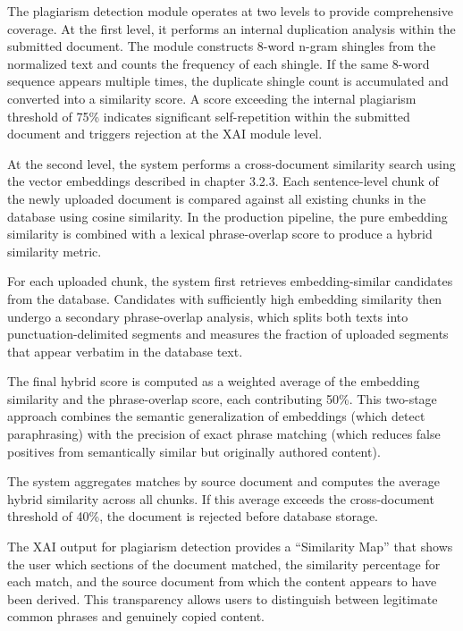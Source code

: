     The plagiarism detection module operates at two levels to provide comprehensive coverage. At the first level, it performs an internal duplication analysis within the submitted document. The module constructs 8-word n-gram shingles from the normalized text and counts the frequency of each shingle. If the same 8-word sequence appears multiple times, the duplicate shingle count is accumulated and converted into a similarity score. A score exceeding the internal plagiarism threshold of 75\% indicates significant self-repetition within the submitted document and triggers rejection at the XAI module level.
    
    At the second level, the system performs a cross-document similarity search using the vector embeddings described in chapter 3.2.3. Each sentence-level chunk of the newly uploaded document is compared against all existing chunks in the database using cosine similarity. In the production pipeline, the pure embedding similarity is combined with a lexical phrase-overlap score to produce a hybrid similarity metric.
    
    For each uploaded chunk, the system first retrieves embedding-similar candidates from the database. Candidates with sufficiently high embedding similarity then undergo a secondary phrase-overlap analysis, which splits both texts into punctuation-delimited segments and measures the fraction of uploaded segments that appear verbatim in the database text.
    
    The final hybrid score is computed as a weighted average of the embedding similarity and the phrase-overlap score, each contributing 50\%. This two-stage approach combines the semantic generalization of embeddings (which detect paraphrasing) with the precision of exact phrase matching (which reduces false positives from semantically similar but originally authored content).
    
    The system aggregates matches by source document and computes the average hybrid similarity across all chunks. If this average exceeds the cross-document threshold of 40\%, the document is rejected before database storage.
    
    The XAI output for plagiarism detection provides a ``Similarity Map'' that shows the user which sections of the document matched, the similarity percentage for each match, and the source document from which the content appears to have been derived. This transparency allows users to distinguish between legitimate common phrases and genuinely copied content.
    
